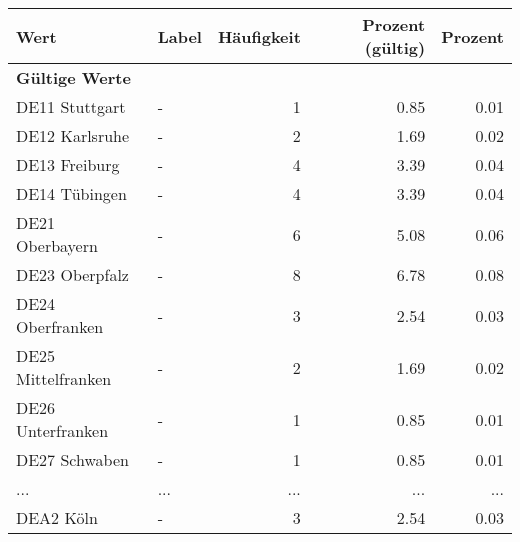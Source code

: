      \begin{longtable}{Xlrrr}
     \toprule
     \textbf{Wert} & \textbf{Label} & \textbf{Häufigkeit} & \textbf{Prozent (gültig)} & \textbf{Prozent} \\
     \endhead
     \midrule
     \multicolumn{5}{l}{\textbf{Gültige Werte}}\\
        \multicolumn{1}{X}{DE11 Stuttgart} & - & \num{1} & \num[round-mode=places,round-precision=2]{0.85} & \num[round-mode=places,round-precision=2]{0.01} \\
        \multicolumn{1}{X}{DE12 Karlsruhe} & - & \num{2} & \num[round-mode=places,round-precision=2]{1.69} & \num[round-mode=places,round-precision=2]{0.02} \\
        \multicolumn{1}{X}{DE13 Freiburg} & - & \num{4} & \num[round-mode=places,round-precision=2]{3.39} & \num[round-mode=places,round-precision=2]{0.04} \\
        \multicolumn{1}{X}{DE14 Tübingen} & - & \num{4} & \num[round-mode=places,round-precision=2]{3.39} & \num[round-mode=places,round-precision=2]{0.04} \\
        \multicolumn{1}{X}{DE21 Oberbayern} & - & \num{6} & \num[round-mode=places,round-precision=2]{5.08} & \num[round-mode=places,round-precision=2]{0.06} \\
        \multicolumn{1}{X}{DE23 Oberpfalz} & - & \num{8} & \num[round-mode=places,round-precision=2]{6.78} & \num[round-mode=places,round-precision=2]{0.08} \\
        \multicolumn{1}{X}{DE24 Oberfranken} & - & \num{3} & \num[round-mode=places,round-precision=2]{2.54} & \num[round-mode=places,round-precision=2]{0.03} \\
        \multicolumn{1}{X}{DE25 Mittelfranken} & - & \num{2} & \num[round-mode=places,round-precision=2]{1.69} & \num[round-mode=places,round-precision=2]{0.02} \\
        \multicolumn{1}{X}{DE26 Unterfranken} & - & \num{1} & \num[round-mode=places,round-precision=2]{0.85} & \num[round-mode=places,round-precision=2]{0.01} \\
        \multicolumn{1}{X}{DE27 Schwaben} & - & \num{1} & \num[round-mode=places,round-precision=2]{0.85} & \num[round-mode=places,round-precision=2]{0.01} \\
       ... & ... & ... & ... & ... \\
        \multicolumn{1}{X}{DEA2 Köln} & - & \num{3} & \num[round-mode=places,round-precision=2]{2.54} & \num[round-mode=places,round-precision=2]{0.03} \\

\end{longtable}

